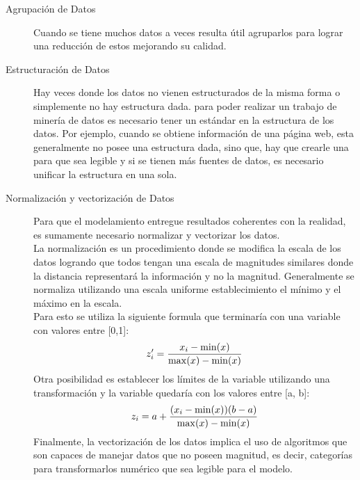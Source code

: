 \begin{description}
  \item[Agrupación de Datos]
  Cuando se tiene muchos datos a veces resulta útil agruparlos para lograr una reducción de estos mejorando su calidad.
  \item[Estructuración de Datos]
  Hay veces donde los datos no  vienen estructurados de la misma forma o simplemente no hay estructura dada. para poder realizar un trabajo de minería de datos es necesario tener un estándar en la estructura de los datos. Por ejemplo, cuando se obtiene información de una página web, esta generalmente no posee una estructura dada, sino que, hay que crearle una para que sea legible y si se tienen más fuentes de datos, es necesario unificar la estructura en una sola.
  \item[Normalización y vectorización de Datos]
  Para que el modelamiento entregue resultados coherentes con la realidad, es sumamente necesario normalizar y vectorizar los datos.\\
  La normalización es un procedimiento donde se modifica la escala de los datos logrando que todos tengan una escala de magnitudes similares donde la distancia representará la información y no la magnitud. Generalmente se normaliza utilizando una escala uniforme establecimiento el mínimo y el máximo en la escala. \\Para esto se utiliza la siguiente formula que terminaría con una variable con valores entre [0,1]:
  \begin{equation*}
  \centering
        z^{\prime}_{i}=\frac{x_i-\min(x)}{\max(x)-\min(x)}
  \end{equation*}
  Otra posibilidad es establecer los límites de la variable utilizando una transformación y la variable quedaría con los valores entre [a, b]:
  \begin{equation*}
  \centering
       z_i=a + \frac{(x_i-\min(x))(b - a)}{\max(x)-\min(x)}
  \end{equation*}
  Finalmente, la vectorización de los datos implica el uso de algoritmos que son capaces de manejar datos que no poseen magnitud, es decir, categorías para transformarlos numérico que sea legible para el modelo.
  

\end{description}
